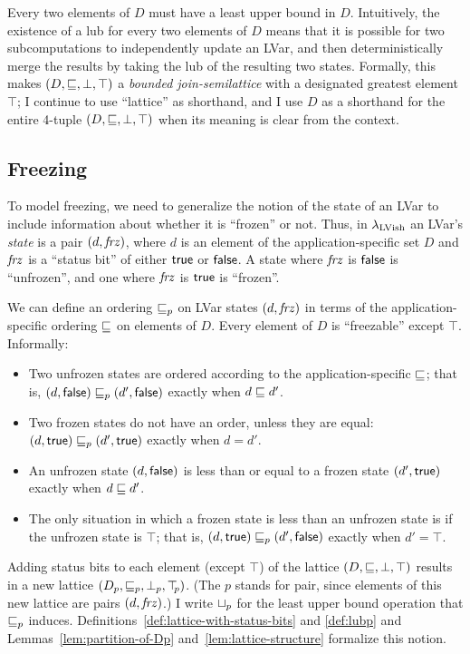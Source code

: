 Every two elements of $D$ must have a least upper bound in $D$.
Intuitively, the existence of a lub for every two elements of $D$
means that it is possible for two subcomputations to independently
update an LVar, and then deterministically merge the results by taking
the lub of the resulting two states.  Formally, this makes $(D,
\sqsubseteq, \bot, \top)$ a \emph{bounded join-semilattice} with a
designated greatest element $\top$; I continue to use ``lattice'' as
shorthand, and I use $D$ as a shorthand for the entire 4-tuple $(D,
\sqsubseteq, \bot, \top)$ when its meaning is clear from the context.

\subsection{Freezing}

To model freezing, we need to generalize the notion of the state of an
LVar to include information about whether it is ``frozen'' or not.
Thus, in $\lambda_{\textrm{LVish}}$ an LVar's \emph{state} is a pair
$(d, \mathit{frz})$, where $d$ is an element of the
application-specific set $D$ and $\mathit{frz}$ is a ``status bit'' of
either $\textsf{true}$ or $\textsf{false}$.  A state where $\mathit{frz}$ is
$\textsf{false}$ is ``unfrozen'', and one where $\mathit{frz}$ is
$\textsf{true}$ is ``frozen''.

We can define an ordering $\sqsubseteq_p$ on LVar states $(d, \mathit{frz})$
in terms of the application-specific ordering $\sqsubseteq$ on elements
of $D$.  Every element of $D$ is ``freezable'' except $\top$.
Informally:
\begin{itemize}
\item Two unfrozen states are ordered according to the
  application-specific $\sqsubseteq$; that is, $(d, \textsf{false})
  \sqsubseteq_p (d', \textsf{false})$ exactly when $d \sqsubseteq d'$.
\item Two frozen states do not have an order, unless they are equal:
  $(d, \textsf{true}) \sqsubseteq_p (d', \textsf{true})$ exactly when
  $d = d'$.
\item An unfrozen state $(d, \textsf{false})$ is less than or
  equal to a frozen state $(d', \textsf{true})$ exactly when $d
  \sqsubseteq d'$.
\item The only situation in which a frozen state is less than an
  unfrozen state is if the unfrozen state is $\top$; that is,
  $(d, \textsf{true}) \sqsubseteq_p (d', \textsf{false})$ exactly when
  $d' = \top$.
\end{itemize}
Adding status bits to each element (except $\top$) of the lattice $(D,
\sqsubseteq, \bot, \top)$ results in a new lattice $(D_p, \sqsubseteq_p, \bot_{p},
\top\hspace{-0.85mm}_{p})$.  (The $p$ stands for pair, since elements of this new lattice
are pairs $(d, \mathit{frz})$.) I write $ \sqcup_p $ for the least
upper bound operation that $\sqsubseteq_p$ induces.
Definitions~\ref{def:lattice-with-status-bits} and \ref{def:lubp} and
Lemmas~\ref{lem:partition-of-Dp} and~\ref{lem:lattice-structure}
formalize this notion.

